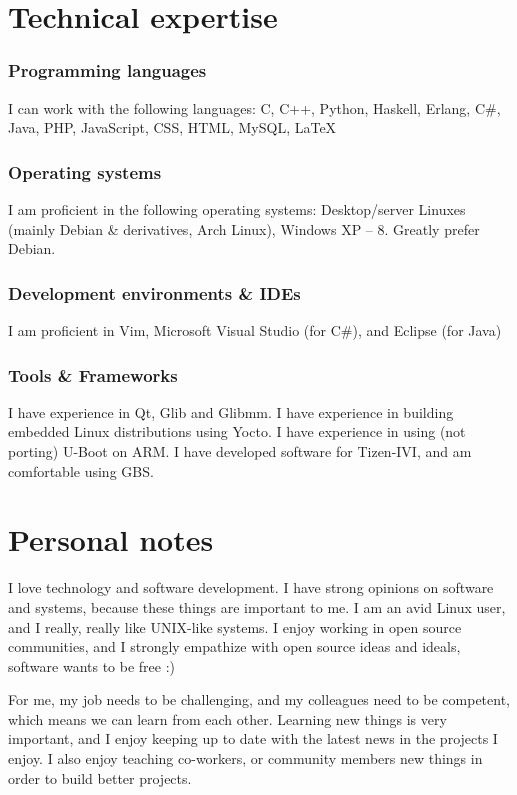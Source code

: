 \documentclass{twocolcv}
\begin{document}
\section*{Technical expertise}
\subsubsection*{Programming languages}
I can work with the following languages: C, C++, Python, Haskell, Erlang, C\#, Java, PHP, JavaScript, CSS, HTML, MySQL, \LaTeX
\subsubsection*{Operating systems}
I am proficient in the following operating systems: Desktop/server Linuxes (mainly Debian \& derivatives, Arch Linux), Windows XP -- 8. Greatly prefer Debian.
\subsubsection*{Development environments \& IDEs}
I am proficient in Vim, Microsoft Visual Studio (for C\#), and Eclipse (for Java)
\subsubsection*{Tools \& Frameworks}
I have experience in Qt, Glib and Glibmm. I have experience in building embedded Linux distributions using Yocto. I have experience in using (not porting) U-Boot on ARM. I have developed software for Tizen-IVI, and am comfortable using GBS.

\section*{Personal notes}
I love technology and software development. I have strong opinions on software and systems, because these things are important to me. I am an avid Linux user, and I really, really like UNIX-like systems. I enjoy working in open source communities, and I strongly empathize with open source ideas and ideals, software wants to be free :)

For me, my job needs to be challenging, and my colleagues need to be competent, which means we can learn from each other. Learning new things is very important, and I enjoy keeping up to date with the latest news in the projects I enjoy. I also enjoy teaching co-workers, or community members new things in order to build better projects.
\end{document}
